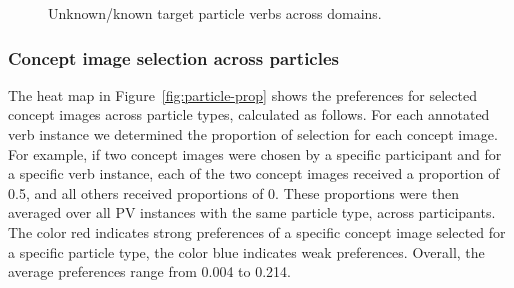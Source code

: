 \documentclass[output=paper]{langsci/langscibook}
\begin{document}
\begin{figure}[p]
  \caption{Unknown/known target particle verbs across domains.}
  \label{fig:neo-ratings-domain}\raggedright
\end{figure}


\subsubsection{Concept image selection across particles}

The heat map in Figure~\ref{fig:particle-prop} shows the preferences
for selected concept images across particle types, calculated as
follows. For each annotated verb instance we determined the proportion
of selection for each concept image. For example, if two concept
images were chosen by a specific participant and for a specific verb
instance, each of the two concept images received a proportion of 0.5,
and all others received proportions of 0. These proportions were then
averaged over all PV instances with the same particle type, across
participants. The color red indicates strong preferences of a specific
concept image selected for a specific particle type, the color blue
indicates weak preferences. Overall, the average preferences range
from 0.004 to 0.214.
\end{document}
